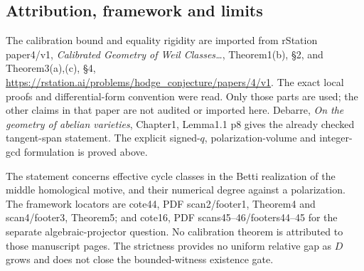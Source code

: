 \subsection{Attribution, framework and limits}\label{attribution-framework-and-limits}

The calibration bound and equality rigidity are imported from rStation paper4/v1, \emph{Calibrated Geometry of Weil Classes\ldots{}}, Theorem1(b), §2, and Theorem3(a),(c), §4, \url{https://rstation.ai/problems/hodge_conjecture/papers/4/v1}. The exact local proofs and differential-form convention were read. Only those parts are used; the other claims in that paper are not audited or imported here. Debarre, \emph{On the geometry of abelian varieties}, Chapter1, Lemma1.1 p8 gives the already checked tangent-span statement. The explicit signed-\(q\), polarization-volume and integer-gcd formulation is proved above.

The statement concerns effective cycle classes in the Betti realization of the middle homological motive, and their numerical degree against a polarization. The framework locators are cote44, PDF scan2/footer1, Theorem4 and scan4/footer3, Theorem5; and cote16, PDF scans45--46/footers44--45 for the separate algebraic-projector question. No calibration theorem is attributed to those manuscript pages. The strictness provides no uniform relative gap as \(D\) grows and does not close the bounded-witness existence gate.
